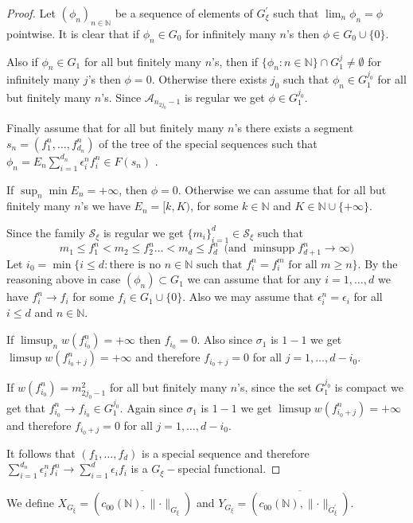 \documentclass[a4paper]{amsart}
\theoremstyle{plain}
\newcommand{\N}{\mathbb{N}}
\newcommand{\mc}{\mathcal}
\newcommand{\e}{\epsilon}
\newcommand{\norm}[1][\cdot]{\lVert #1\rVert}
\DeclareMathOperator{\minsupp}{minsupp}
\begin{document}
\begin{proof}
Let  $(\phi_{n})_{n\in\N}$ be  a  sequence of elements of $G^{\prime}_{\xi}$ such that
$\lim_{n}\phi_{n}=\phi$  pointwise. It is clear that if  $\phi_{n}\in G_0$ for infinitely
many $n$'s then $\phi\in G_0\cup\{0\}$.

Also if  $\phi_n\in G_{1}$ for all but finitely many $n$'s, then if
$\{\phi_{n}:n\in\N\}\cap G_{1}^{j}\ne\emptyset$ for infinitely many $j$'s then $\phi=0$.
Otherwise  there exists $j_0$ such that $\phi_{n}\in G_{1}^{j_0}$ for all but finitely
many $n$'s. Since $\mc{A}_{n_{2j_0}-1}$ is regular we get $\phi\in G_{1}^{j_0}$.

Finally  assume that   for all but finitely many $n$'s there exists a segment
 $s_{n}=(f_{1}^{n},\dots,f_{d_n}^{n})$ of the tree of the special sequences such that
$\phi_{n}=E_n\sum_{i=1}^{d_{n}}\e_i^{n}f_{i}^{n}\in F(s_n)$ .

If $\sup_{n}\min E_n=+\infty$, then $\phi=0$.
Otherwise we can
assume that for all but finitely many $n$'s we have $E_n=[k,K)$, for some $k\in\N$ and
$K\in\N\cup\{+\infty\}$.

Since the family $\mc{S}_{\xi}$ is regular we get $\{m_{i}\}_{i=1}^{d}\in \mc{S}_{\xi}$
such that
$$
m_{1}\leq f_{1}^{n}<m_{2}\leq f_{2}^{n}\dots <m_{d}\leq f_{d}^{n}\,\,\,\textrm{(and $\minsupp f_{d+1}^{n}\to\infty$)}
$$
Let $i_0=\min\{i\leq d:\textrm{there is no $n\in\N$ such that $f_{i}^{n}= f_{i}^{m}$ for
all $m\geq n$}\}. $ By the reasoning above in case $(\phi_n)\subset G_1$ we can assume
that for any $i=1,\dots,d$ we have $f_i^n\to f_i$ for some $f_i\in G_1\cup \{0\}$. Also we may assume that $\e_{i}^{n}=\e_{i}$ for all $i\leq d$ and  $n\in\N$.

If $\limsup_{n} w(f_{i_0}^{n})=+\infty$ then $f_{i_0}=0$. Also since
$\sigma_{1}$ is $1-1$ we get  $\limsup w(f_{i_0+j}^{n})=+\infty$
and therefore $f_{i_0+j}=0$ for all $j=1,\dots,d-i_0$.

If $w(f_{i_0}^{n})=m_{2j_0-1}^2$ for all but finitely many $n$'s, since the set
$G_{1}^{j_0}$ is compact we get that  $f_{i_0}^{n}\to f_{i_0}\in G_{1}^{j_0}$. Again
since $\sigma_{1}$ is $1-1$ we get $\limsup w(f_{i_0+j}^{n})=+\infty$ and therefore
$f_{i_0+j}=0$ for all $j=1,\dots,d-i_0$.

It follows that  $(f_{1},\dots, f_{d})$ is a special sequence and therefore
 $\sum_{i=1}^{d_n}\e_{i}^{n}f_{i}^{n}\to \sum_{i=1}^{d}\e_{i}f_{i}$ is a $G_{\xi}-$special functional.
\end{proof}
We define $X_{G_{\xi}}=\overline{(c_{00}(\N),\norm_{G_{\xi}})}$ and
$Y_{G_\xi}=\overline{(c_{00}(\N),\norm_{G^{\prime}_{\xi}})}$.
\end{document}
